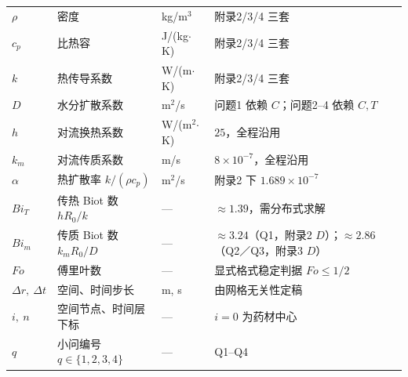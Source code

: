 \begin{table}[htbp]
\begin{tabular}{llll}
    \midrule
    $\rho$                    & 密度                        & kg/m$^3$                & 附录2/3/4 三套 \\
    $c_p$                     & 比热容                      & J/(kg$\cdot$K)          & 附录2/3/4 三套 \\
    $k$                       & 热传导系数                  & W/(m$\cdot$K)           & 附录2/3/4 三套 \\
    $D$                       & 水分扩散系数                & m$^2$/s                 & 问题1 依赖 $C$；问题2--4 依赖 $C,T$ \\
    $h$                       & 对流换热系数                & W/(m$^2$$\cdot$K)       & $25$，全程沿用 \\
    $k_m$                     & 对流传质系数                & m/s                     & $8\times10^{-7}$，全程沿用 \\
    $\alpha$                  & 热扩散率 $k/(\rho c_p)$     & m$^2$/s                 & 附录2 下 $1.689\times10^{-7}$ \\
    \midrule
    $Bi_T$                    & 传热 Biot 数 $hR_0/k$       & ---                     & $\approx1.39$，需分布式求解 \\
    $Bi_m$                    & 传质 Biot 数 $k_mR_0/D$     & ---                     & $\approx3.24$（Q1，附录2 $D$）；$\approx2.86$（Q2／Q3，附录3 $D$） \\
    $Fo$                      & 傅里叶数                    & ---                     & 显式格式稳定判据 $Fo\le1/2$ \\
    $\Delta r,\ \Delta t$     & 空间、时间步长              & m, s                    & 由网格无关性定稿 \\
    \midrule
    $i,\ n$                   & 空间节点、时间层下标        & ---                     & $i=0$ 为药材中心 \\
    $q$                       & 小问编号 $q\in\{1,2,3,4\}$  & ---                     & Q1--Q4 \\
    \bottomrule
  \end{tabular}
\end{table}
